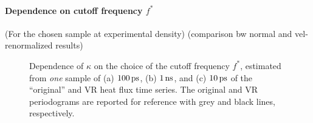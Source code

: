 \paragraph{Dependence on cutoff frequency $f^*$}
(For the chosen sample at experimental density)
(comparison bw normal and vel-renormalized results)

\begin{figure}
    \centering
    \caption{Dependence of $\kappa$ on the choice of the cutoff frequency $f^*$, estimated from \emph{one} sample of (a) $100\,\mathrm{ps}$, (b) $1\,\mathrm{ns}$, and (c) $10\,\mathrm{ps}$ of the ``original'' and VR heat flux time series. 
    The original and VR periodograms are reported for reference with grey and black lines, respectively.}
    \label{fig:csilica-sample-expdens-fstar}
\end{figure}
